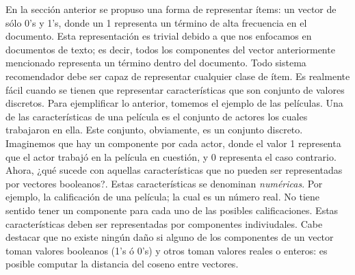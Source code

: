 				En la sección anterior se propuso una forma de representar ítems: un vector de sólo 0's y 1's, donde un 1 representa un término de alta frecuencia en el documento. Esta representación es trivial debido a que nos enfocamos en documentos de texto; es decir, todos los componentes del vector anteriormente mencionado representa un término dentro del documento. Todo sistema recomendador debe ser capaz de representar cualquier clase de ítem. Es realmente fácil cuando se tienen que representar características que son conjunto de valores discretos. Para ejemplificar lo anterior, tomemos el ejemplo de las películas. Una de las características de una película es el conjunto de actores los cuales trabajaron en ella. Este conjunto, obviamente, es un conjunto discreto. Imaginemos que hay un componente por cada actor, donde el valor 1 representa que el actor trabajó en la película en cuestión, y 0 representa el caso contrario. \\
				Ahora, ¿qué sucede con aquellas características que no pueden ser representadas por vectores booleanos?. Estas características se denominan \textit{numéricas}. Por ejemplo, la calificación de una película; la cual es un número real. No tiene sentido tener un componente para cada uno de las posibles calificaciones. Estas características deben ser representadas por componentes indiviudales. Cabe destacar que no existe ningún daño si alguno de los componentes de un vector toman valores booleanos (1's ó 0's) y otros toman valores reales o enteros: es posible computar la distancia del coseno entre vectores.

